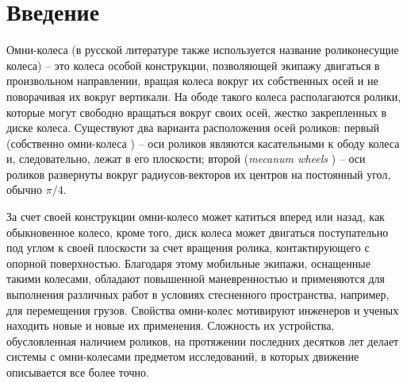\chapter*{\vspace{-75pt}Введение}

Омни-колеса (в русской литературе также используется название роликонесущие колеса) -- это колеса особой конструкции, позволяющей экипажу двигаться в произвольном направлении, вращая колеса вокруг их собственных осей и не поворачивая их вокруг вертикали. На ободе такого колеса располагаются ролики, которые могут свободно вращаться вокруг своих осей, жестко закрепленных в диске колеса. Существуют два варианта расположения осей роликов: первый  (собственно омни-колеса \cite{formalskii}) -- оси роликов являются касательными к ободу колеса и, следовательно, лежат в его плоскости; второй (\textit{mecanum wheels} \cite{Ilon}) -- оси роликов развернуты вокруг радиусов-векторов их центров на постоянный угол, обычно $\pi/4$.

За счет своей конструкции омни-колесо может катиться вперед или назад, как обыкновенное колесо, кроме того, диск колеса может двигаться поступательно под углом к своей плоскости за счет вращения ролика, контактирующего с опорной поверхностью. Благодаря этому мобильные экипажи, оснащенные такими колесами, обладают повышенной маневренностью и применяются для выполнения различных работ в условиях стесненного пространства, например, для перемещения грузов.
Свойства омни-колес мотивируют инженеров и ученых находить новые и новые их применения.
Сложность их устройства, обусловленная наличием роликов, на протяжении последних десятков лет делает системы с омни-колесами предметом исследований, в которых движение описывается все более точно.

